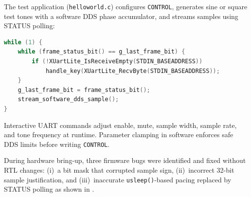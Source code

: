 The test application (\texttt{helloworld.c}) configures \texttt{CONTROL}, generates sine or square test tones with a software DDS phase accumulator, and streams samples using STATUS polling:

\begin{lstlisting}[language=C, caption={STATUS-polling sample loop.}, label={lst:firmware}]
while (1) {
    while (frame_status_bit() == g_last_frame_bit) {
        if (!XUartLite_IsReceiveEmpty(STDIN_BASEADDRESS))
            handle_key(XUartLite_RecvByte(STDIN_BASEADDRESS));
    }
    g_last_frame_bit = frame_status_bit();
    stream_software_dds_sample();
}
\end{lstlisting}

Interactive UART commands adjust enable, mute, sample width, sample rate, and tone frequency at runtime.
Parameter clamping in software enforces safe DDS limits before writing \texttt{CONTROL}.

During hardware bring-up, three firmware bugs were identified and fixed without RTL changes: (i)~a bit mask that corrupted sample sign, (ii)~incorrect 32-bit sample justification, and (iii)~inaccurate \texttt{usleep()}-based pacing replaced by STATUS polling as shown in .
